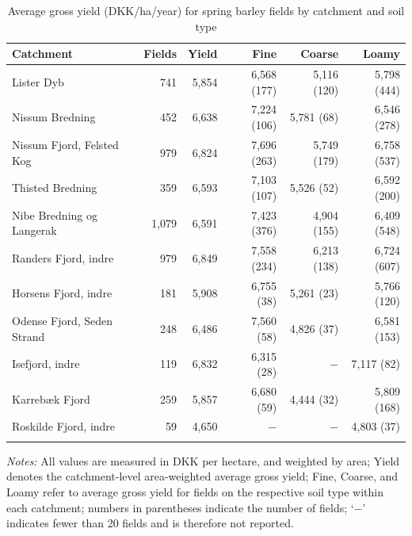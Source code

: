 \documentclass[12pt]{article}
\begin{document}
\begin{table}[H]
\centering
\small
\caption{Average gross yield (DKK/ha/year) for spring barley fields by catchment and soil type}
\label{tab:yield-vaarbyg}
\begin{threeparttable}
\begin{tabular}{lrrrrr}
\toprule
\textbf{Catchment} & \textbf{Fields} & \textbf{Yield} & \textbf{Fine} &
\textbf{Coarse} & \textbf{Loamy} \\
\midrule\addlinespace
Lister Dyb                 & 741   & 5,854 & 6,568 (177) & 5,116 (120)  & 5,798 (444) \\
Nissum Bredning            & 452   & 6,638 & 7,224 (106) & 5,781 (68)   & 6,546 (278) \\
Nissum Fjord, Felsted Kog  & 979   & 6,824 & 7,696 (263) & 5,749 (179)  & 6,758 (537) \\
Thisted Bredning           & 359   & 6,593 & 7,103 (107) & 5,526 (52)   & 6,592 (200) \\
Nibe Bredning og Langerak  & 1,079 & 6,591 & 7,423 (376) & 4,904 (155)  & 6,409 (548) \\
Randers Fjord, indre       & 979   & 6,849 & 7,558 (234) & 6,213 (138)  & 6,724 (607) \\
Horsens Fjord, indre       & 181   & 5,908 & 6,755 (38)  & 5,261 (23)   & 5,766 (120) \\
Odense Fjord, Seden Strand & 248   & 6,486 & 7,560 (58)  & 4,826 (37)   & 6,581 (153) \\
Isefjord, indre            & 119   & 6,832 & 6,315 (28)  & $-$           & 7,117 (82)  \\
Karrebæk Fjord             & 259   & 5,857 & 6,680 (59)  & 4,444 (32)   & 5,809 (168) \\
Roskilde Fjord, indre      &  59   & 4,650 & $-$          & $-$           & 4,803 (37)  \\
\addlinespace\bottomrule
\end{tabular}
\begin{tablenotes}
\footnotesize
\item \textit{Notes:} All values are measured in DKK per hectare, and weighted by area;
Yield denotes the catchment-level area-weighted average gross yield;
Fine, Coarse, and Loamy refer to average gross yield for fields on the respective
soil type within each catchment; numbers in parentheses indicate the number of
fields; `$-$' indicates fewer than 20 fields and is therefore not reported.
\end{tablenotes}
\end{threeparttable}
\end{table}
\end{document}
